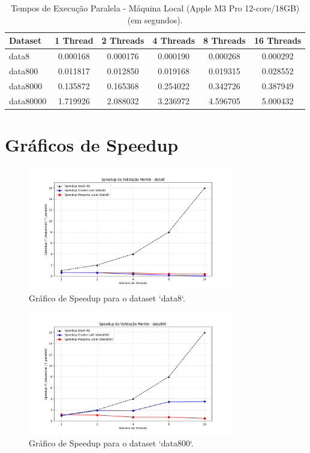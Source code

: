 \documentclass[10pt,a4paper]{article}
\begin{document}
\begin{table}[H]
    \centering
    \caption{Tempos de Execução Paralela - Máquina Local (Apple M3 Pro 12-core/18GB) (em segundos).}
    \label{tab:par_times_local}
    \begin{tabular}{l S S S S S}
        \toprule
        Dataset   & {1 Thread} & {2 Threads} & {4 Threads} & {8 Threads} & {16 Threads} \\
        \midrule
        data8     & 0.000168 & 0.000176 & 0.000190 & 0.000268 & 0.000292 \\
        data800   & 0.011817 & 0.012850 & 0.019168 & 0.019315 & 0.028552 \\
        data8000  & 0.135872 & 0.165368 & 0.254022 & 0.342726 & 0.387949 \\
        data80000 & 1.719926 & 2.088032 & 3.236972 & 4.596705 & 5.000432 \\
        \bottomrule
    \end{tabular}
\end{table}


\clearpage
\section{Gráficos de Speedup}
\label{app:graficos}

\begin{figure}[!htbp]
    \centering
    \includegraphics[width=0.8\textwidth]{graficos/speedup_data8.png}
    \caption{Gráfico de Speedup para o dataset `data8`.}
    \label{fig:speedup_data8}
\end{figure}

\begin{figure}[!htbp]
    \centering
    \includegraphics[width=0.8\textwidth]{graficos/speedup_data800.png}
    \caption{Gráfico de Speedup para o dataset `data800`.}
    \label{fig:speedup_data800}
\end{figure}
\end{document}
